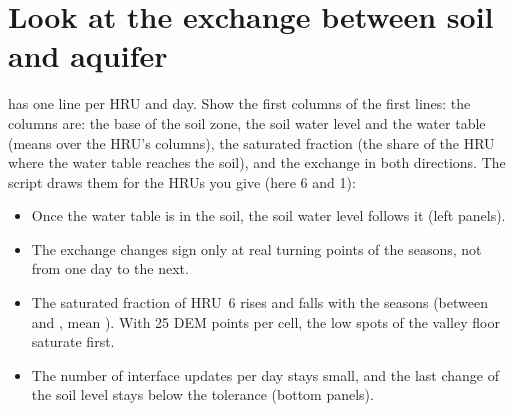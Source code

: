 \section{Look at the exchange between soil and aquifer}

 has one line per HRU and day. Show the first columns of the first lines:
\why the columns are: the base of the soil zone, the soil water level and the water table (means over the HRU's
columns), the saturated fraction (the share of the HRU where the water table reaches the soil), and the exchange in both
directions. The script  draws them for the HRUs you give (here 6 and 1):
\begin{tocheck}
\begin{itemize}
\item Once the water table is in the soil, the soil water level follows it (left panels).
\item The exchange changes sign only at real turning points of the seasons, not from one day to the next.
\item The saturated fraction of HRU~6 rises and falls with the seasons (between  and , mean
  ). With 25 DEM points per cell, the low spots of the valley floor saturate first.
\item The number of interface updates per day stays small, and the last change of the soil level stays below the
  tolerance (bottom panels).
\end{itemize}
\end{tocheck}
